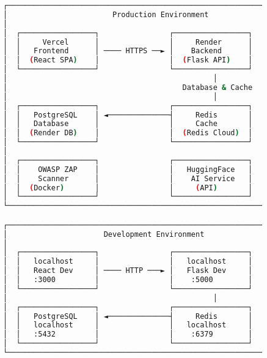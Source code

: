 \documentclass[main.tex]{subfiles}
\begin{document}
\begin{figure}[h]
\centering
\begin{lstlisting}[language=bash, caption=Production deployment архитектур]
┌─────────────────────────────────────────────────────────────────┐
│                        Production Environment                    │
│                                                                 │
│  ┌─────────────────┐                ┌─────────────────┐         │
│  │     Vercel      │                │     Render      │         │
│  │   Frontend      │ ──── HTTPS ──► │    Backend      │         │
│  │  (React SPA)    │                │  (Flask API)    │         │
│  └─────────────────┘                └─────────────────┘         │
│                                               │                 │
│                                        Database & Cache         │
│                                               │                 │
│  ┌─────────────────┐                ┌─────────────────┐         │
│  │   PostgreSQL    │ ◄──────────────┤     Redis       │         │
│  │   Database      │                │     Cache       │         │
│  │  (Render DB)    │                │  (Redis Cloud)  │         │
│  └─────────────────┘                └─────────────────┘         │
│                                                                 │
│  ┌─────────────────┐                ┌─────────────────┐         │
│  │    OWASP ZAP    │                │   HuggingFace   │         │
│  │    Scanner      │                │    AI Service   │         │
│  │  (Docker)       │                │     (API)       │         │
│  └─────────────────┘                └─────────────────┘         │
└─────────────────────────────────────────────────────────────────┘

┌─────────────────────────────────────────────────────────────────┐
│                      Development Environment                    │
│                                                                 │
│  ┌─────────────────┐                ┌─────────────────┐         │
│  │   localhost     │                │   localhost     │         │
│  │   React Dev     │ ──── HTTP ───► │   Flask Dev     │         │
│  │   :3000         │                │    :5000        │         │
│  └─────────────────┘                └─────────────────┘         │
│                                               │                 │
│  ┌─────────────────┐                ┌─────────────────┐         │
│  │   PostgreSQL    │ ◄──────────────┤     Redis       │         │
│  │   localhost     │                │   localhost     │         │
│  │   :5432         │                │    :6379        │         │
│  └─────────────────┘                └─────────────────┘         │
└─────────────────────────────────────────────────────────────────┘
\end{lstlisting}
\end{figure}
\end{document}
